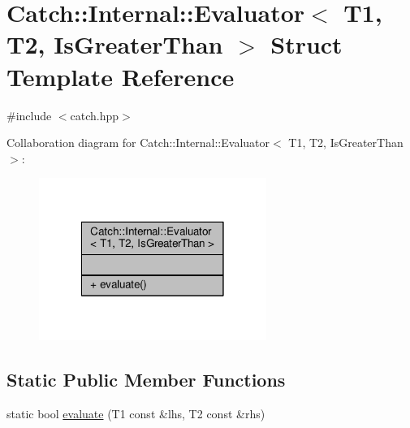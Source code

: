 \hypertarget{struct_catch_1_1_internal_1_1_evaluator_3_01_t1_00_01_t2_00_01_is_greater_than_01_4}{\section{Catch\-:\-:Internal\-:\-:Evaluator$<$ T1, T2, Is\-Greater\-Than $>$ Struct Template Reference}
\label{struct_catch_1_1_internal_1_1_evaluator_3_01_t1_00_01_t2_00_01_is_greater_than_01_4}
}


{\ttfamily \#include $<$catch.\-hpp$>$}



Collaboration diagram for Catch\-:\-:Internal\-:\-:Evaluator$<$ T1, T2, Is\-Greater\-Than $>$\-:
\nopagebreak
\begin{figure}[H]
\begin{center}
\leavevmode
\includegraphics[width=210pt]{struct_catch_1_1_internal_1_1_evaluator_3_01_t1_00_01_t2_00_01_is_greater_than_01_4__coll__graph}
\end{center}
\end{figure}
\subsection*{Static Public Member Functions}
\begin{DoxyCompactItemize}
\item 
static bool \hyperlink{struct_catch_1_1_internal_1_1_evaluator_3_01_t1_00_01_t2_00_01_is_greater_than_01_4_a55745f74f09ac5c61bd3d592ca5560af}{evaluate} (T1 const \&lhs, T2 const \&rhs)
\end{DoxyCompactItemize}


